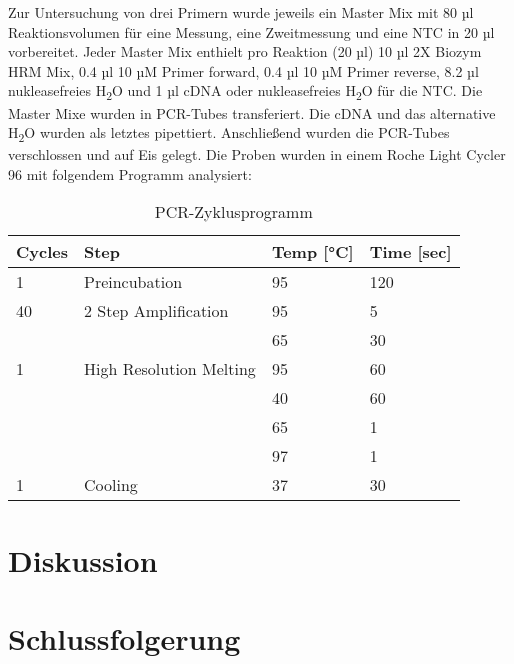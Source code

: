 \documentclass{article}
\begin{document}
Zur Untersuchung von drei Primern wurde jeweils ein
Master Mix mit 80 µl Reaktionsvolumen für eine Messung,
eine Zweitmessung und eine NTC in 20 µl vorbereitet.
Jeder Master Mix enthielt pro Reaktion (20 µl) 10 µl 2X Biozym HRM Mix,
0.4 µl 10 µM Primer forward, 0.4 µl 10 µM Primer reverse, 8.2 µl
nukleasefreies H\textsubscript{2}O und 1 µl cDNA oder
nukleasefreies H\textsubscript{2}O für die NTC. Die Master Mixe
wurden in PCR-Tubes transferiert. Die cDNA und das
alternative H\textsubscript{2}O wurden als letztes pipettiert.
Anschließend wurden die PCR-Tubes verschlossen und auf Eis gelegt.
Die Proben wurden in einem Roche Light Cycler 96 mit folgendem
Programm analysiert:

\begin{table}[H]
\centering
\begin{tabular}{|l|l|l|l|}
\hline
\textbf{Cycles} & \textbf{Step} & \textbf{Temp [°C]} & \textbf{Time [sec]} \\ \hline
1 & Preincubation & 95 & 120 \\ \hline
40 & 2 Step Amplification & 95 & 5 \\ \hline
 &  & 65 & 30 \\ \hline
1 & High Resolution Melting & 95 & 60 \\ \hline
 &  & 40 & 60 \\ \hline
 &  & 65 & 1 \\ \hline
 &  & 97 & 1 \\ \hline
1 & Cooling & 37 & 30 \\ \hline
\end{tabular}
\caption{PCR-Zyklusprogramm}
\end{table}

\section{Diskussion}

\section{Schlussfolgerung}



\end{document}

